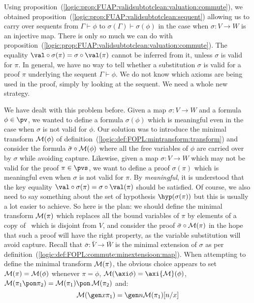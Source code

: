 Using
proposition~(\ref{logic:prop:FUAP:validsubtotclean:valuation:commute}),
we obtained
proposition~(\ref{logic:prop:FUAP:validsubtotclean:sequent})
allowing us to carry over sequents from $\Gamma\vdash\phi$ to
$\sigma(\Gamma)\vdash\sigma(\phi)$ in the case when $\sigma:V\to W$
is an injective map. There is only so much we can do with
proposition~(\ref{logic:prop:FUAP:validsubtotclean:valuation:commute}).
The equality $\val\circ\sigma(\pi)=\sigma\circ\val(\pi)$ cannot be
inferred from it, unless $\sigma$ is valid for $\pi$. In general, we
have no way to tell whether a substitution $\sigma$ is valid for a
proof $\pi$ underlying the sequent $\Gamma\vdash\phi$. We do not
know which axioms are being used in the proof, simply by looking at
the sequent. We need a whole new strategy.

We have dealt with this problem before. Given a map $\sigma:V\to W$
and a formula $\phi\in\pv$, we wanted to define a formula
$\sigma(\phi)$ which is meaningful even in the case when $\sigma$ is
not valid for $\phi$. Our solution was to introduce the minimal
transform ${\cal M}(\phi)$ of
definition~(\ref{logic:def:FOPL:mintransform:transform}) and
consider the formula $\bar{\sigma}\circ{\cal M}(\phi)$ where all the
free variables of $\phi$ are carried over by $\sigma$ while avoiding
capture. Likewise, given a map $\sigma:V\to W$ which may not be
valid for the proof $\pi\in\pvs$, we want to define a proof
$\sigma(\pi)$ which is meaningful even when $\sigma$ is not valid
for $\pi$. By {\em meaningful}, it is understood that the key
equality $\val\circ\sigma(\pi)=\sigma\circ\val(\pi)$ should be
satisfied. Of course, we also need to say something about the set of
hypothesis $\hyp(\sigma(\pi))$ but this is usually a lot easier to
achieve. So here is the plan: we should define the minimal transform
${\cal M}(\pi)$ which replaces all the bound variables of $\pi$ by
elements of a copy of \N\ which is disjoint from $V$, and consider
the proof $\bar{\sigma}\circ{\cal M}(\pi)$ in the hope that such a
proof will have the right property, as the variable substitution
will avoid capture. Recall that $\bar{\sigma}:\bar{V}\to\bar{W}$ is
the minimal extension of $\sigma$ as per
definition~(\ref{logic:def:FOPL:commute:minextensioon:map}). When
attempting to define the minimal transform ${\cal M}(\pi)$, the
obvious choice appears to set ${\cal M}(\pi)={\cal M}(\phi)$
whenever $\pi=\phi$, ${\cal M}(\axi\phi)=\axi{\cal M}(\phi)$, ${\cal
M}(\pi_{1}\pon\pi_{2})={\cal M}(\pi_{1})\pon\,{\cal M}(\pi_{2})$
and:
    \[
    {\cal M}(\gen x\pi_{1})=\gen n{\cal M}(\pi_{1})[n/x]
    \]
